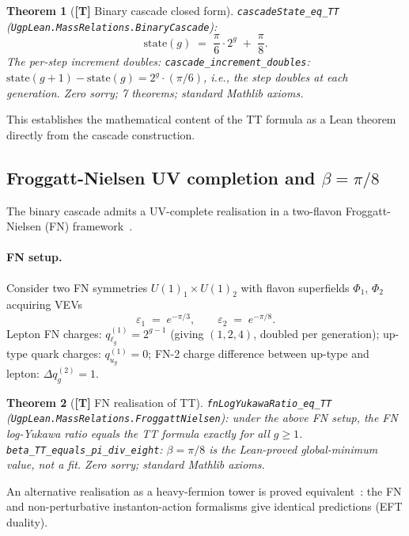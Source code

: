 \documentclass[11pt]{article}
\newtheorem{theorem}{Theorem}[section]
\theoremstyle{remark}
\newcommand{\lean}[1]{\texttt{\small#1}}
\begin{document}
\begin{tcolorbox}[claimA]
\begin{theorem}[\textbf{[T]} Binary cascade closed form]
\label{thm:cascade}
\lean{cascadeState\_eq\_TT} (\lean{UgpLean.MassRelations.BinaryCascade}):
\[
  \mathrm{state}(g) \;=\; \frac{\pi}{6}\cdot 2^g \;+\; \frac{\pi}{8}.
\]
The per-step increment doubles:
\lean{cascade\_increment\_doubles}: $\mathrm{state}(g+1)-\mathrm{state}(g)
= 2^g\cdot(\pi/6)$, i.e., the step doubles at each generation.
Zero sorry; 7 theorems; standard Mathlib axioms.
\end{theorem}
\end{tcolorbox}

\noindent This establishes the mathematical content of the TT formula as a Lean
theorem directly from the cascade construction.

\subsection{Froggatt-Nielsen UV completion and $\beta=\pi/8$}
\label{sec:fn}

The binary cascade admits a UV-complete realisation in a two-flavon
Froggatt-Nielsen (FN) framework~\cite{Froggatt1979}.

\paragraph{FN setup.}
Consider two FN symmetries $U(1)_1 \times U(1)_2$ with flavon superfields
$\Phi_1$, $\Phi_2$ acquiring VEVs
\[
  \varepsilon_1 \;=\; e^{-\pi/3}, \qquad \varepsilon_2 \;=\; e^{-\pi/8}.
\]
Lepton FN charges: $q_{\ell_g}^{(1)} = 2^{g-1}$ (giving $(1,2,4)$, doubled per
generation); up-type quark charges: $q_{u_g}^{(1)} = 0$; FN-2 charge difference
between up-type and lepton: $\Delta q_g^{(2)} = 1$.

\begin{tcolorbox}[claimA]
\begin{theorem}[\textbf{[T]} FN realisation of TT]
\label{thm:fn_tt}
\lean{fnLogYukawaRatio\_eq\_TT}
(\lean{UgpLean.MassRelations.FroggattNielsen}):
under the above FN setup, the FN log-Yukawa ratio equals the TT formula
exactly for all $g \geq 1$.
\lean{beta\_TT\_equals\_pi\_div\_eight}: $\beta = \pi/8$ is the
Lean-proved global-minimum value, not a fit.
Zero sorry; standard Mathlib axioms.
\end{theorem}
\end{tcolorbox}

\noindent An alternative realisation as a heavy-fermion tower is proved
equivalent~\cite[\lean{tower\_eq\_FN}]{ugp-lean}: the FN and non-perturbative
instanton-action formalisms give identical predictions (EFT duality).
\end{document}
